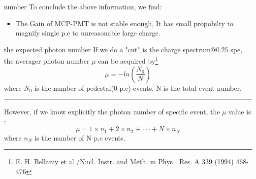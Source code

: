 \documentclass[11pt,compress,xcolor=x11names,UTF8]{beamer}
\begin{document}
\begin{frame}{number}
To conclude  the above information, we find:
	\begin{itemize}
		\item \alert{The Gain of MCP-PMT is not stable enough}, It has small propobilty to magnify single p.e to unreasonable large charge. 
	\end{itemize}
\end{frame}
\begin{frame}{ the expected photon number}
	If we do a "cut" is the charge spectrum@0.25 spe, the averager photon number $\mu$ can be acquired by\footnote{E. H. Bellamy et al /Nucl. Instr. and Meth. m Phys . Res. A 339 (1994) 468-476}
\begin{equation}
	\mu=-ln(\frac{N_{0}}{N})
\end{equation}
	where $N_{0}$ is the number of pedestal(0 p.e) events, N is the total event number.
\vspace{.3cm}
\hrule{\textwidth}
\vspace{.3cm}
However, if we know explicitly the photon number of specific event, the $\mu$ value is :
\begin{equation}
	\mu=1\times n_{1}+2\times n_{2}+\cdot\cdot\cdot+N\times n_{N}
\end{equation}
	where $n_{N}$ is the number of N p.e events.
\end{frame}
%
%
\end{document}
